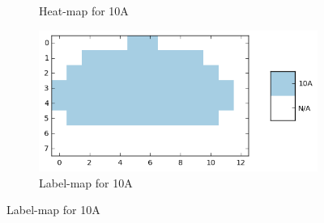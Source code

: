 \begin{figure}
\begin{subfigure}[b]{0.3\textwidth}
\caption{Heat-map for 10A\label{fig:sample1_hm}}
\end{subfigure}
\begin{subfigure}[b]{0.3\textwidth}
\includegraphics[width=\textwidth]{img/sample1_labels.png}
\caption{Label-map for 10A\label{fig:sample1_lab}}
\end{subfigure}


\end{figure}
